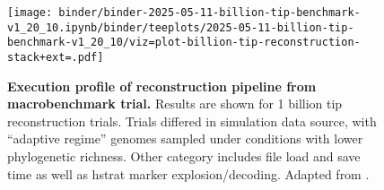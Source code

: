 \begin{figure}[h]
\centering
\texttt{[image: binder/binder-2025-05-11-billion-tip-benchmark-v1\_20\_10.ipynb/binder/teeplots/2025-05-11-billion-tip-benchmark-v1\_20\_10/viz=plot-billion-tip-reconstruction-stack+ext=.pdf]}
\vspace{-1em}
\caption{%
\textbf{Execution profile of reconstruction pipeline from macrobenchmark trial.}
\small
Results are shown for 1 billion tip reconstruction trials.
Trials differed in simulation data source, with ``adaptive regime'' genomes sampled under conditions with lower phylogenetic richness.
Other category includes file load and save time as well as hstrat marker explosion/decoding.
Adapted from \citet{singhvi2025scalable}.
}
\label{fig:billion-tip-time}
\end{figure}

